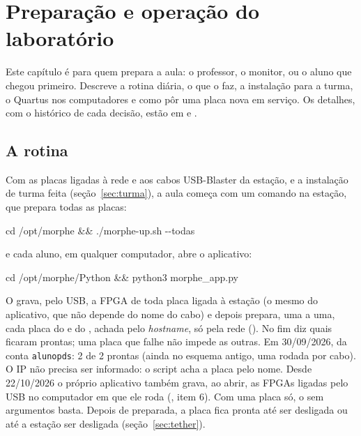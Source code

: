 \chapter{Preparação e operação do laboratório}
\label{cap:laboratorio}

Este capítulo é para quem prepara a aula: o professor, o monitor, ou o aluno que
chegou primeiro. Descreve a rotina diária, o que o  faz, a
instalação para a turma, o Quartus nos computadores e como pôr uma placa nova
em serviço. Os detalhes, com o histórico de cada decisão, estão em
 e .

\section{A rotina}

Com as placas ligadas à rede e aos cabos USB-Blaster da estação, e a instalação
de turma feita (seção~\ref{sec:turma}), a aula começa com um comando na
estação, que prepara todas as placas:

\begin{center}
\ttfamily cd /opt/morphe \&\& ./morphe-up.sh -{}-todas
\end{center}

\noindent e cada aluno, em qualquer computador, abre o aplicativo:

\begin{center}
\ttfamily cd /opt/morphe/Python \&\& python3 morphe\_app.py
\end{center}

O  grava, pelo USB, a FPGA de toda placa ligada à estação (o mesmo
 do aplicativo, que não depende do nome do cabo) e
depois prepara, uma a uma, cada placa do  e do
, achada pelo \emph{hostname}, só pela rede
(). No fim diz quais ficaram prontas; uma placa que falhe não
impede as outras. Em 30/09/2026, da conta \texttt{alunopds}: 2 de 2 prontas
(ainda no esquema antigo, uma rodada por cabo). O IP não precisa ser
informado: o script acha a placa pelo nome. Desde 22/10/2026 o próprio
aplicativo também grava, ao abrir, as FPGAs ligadas pelo USB no computador em
que ele roda (, item 6). Com uma placa só, o
 sem argumentos basta. Depois de preparada, a placa fica
pronta até ser desligada ou até a estação ser desligada
(seção~\ref{sec:tether}).

